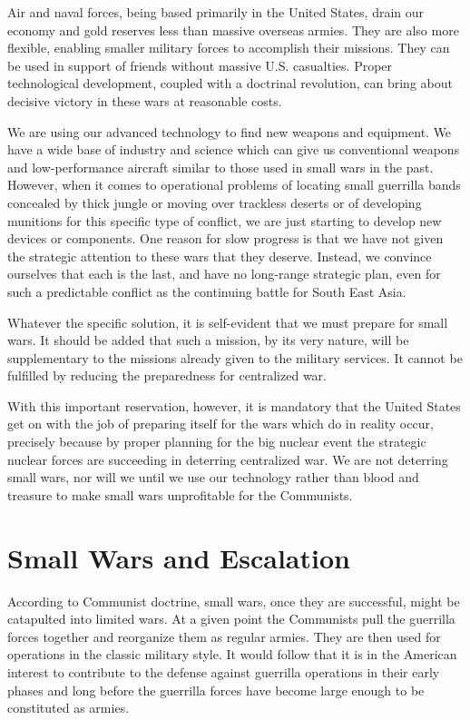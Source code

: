 Air and naval forces, being based primarily in the United States, drain our economy and gold reserves less than massive overseas armies. They are also more flexible, enabling smaller military forces to accomplish their missions. They can be used in support of friends without massive U.S. casualties. Proper technological development, coupled with a doctrinal revolution, can bring about decisive victory in these wars at reasonable costs.

We are using our advanced technology to find new weapons and equipment. We have a wide base of industry and science which can give us conventional weapons and low-performance aircraft similar to those used in small wars in the past. However, when it comes to operational problems of locating small guerrilla bands concealed by thick jungle or moving over trackless deserts or of developing munitions for this specific type of conflict, we are just starting to develop new devices or components. One reason for slow progress is that we have not given the strategic attention to these wars that they deserve. Instead, we convince ourselves that each is the last, and have no long-range strategic plan, even for such a predictable conflict as the continuing battle for South East Asia.

Whatever the specific solution, it is self-evident that we must prepare for small wars. It should be added that such a mission, by its very nature, will be supplementary to the missions already given to the military services. It cannot be fulfilled by reducing the preparedness for centralized war.

With this important reservation, however, it is mandatory that the United States get on with the job of preparing itself for the wars which do in reality occur, precisely because by proper planning for the big nuclear event the strategic nuclear forces are succeeding in deterring centralized war. We are not deterring small wars, nor will we until we use our technology rather than blood and treasure to make small wars unprofitable for the Communists.

\section{Small Wars and Escalation}
According to Communist doctrine, small wars, once they are successful, might be catapulted into limited wars. At a given point the Communists pull the guerrilla forces together and reorganize them as regular armies. They are then used for operations in the classic military style. It would follow that it is in the American interest to contribute to the defense against guerrilla operations in their early phases and long before the guerrilla forces have become large enough to be constituted as armies.

